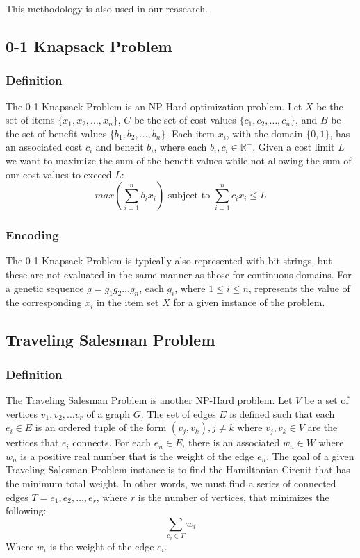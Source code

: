 \noindent This methodology is also used in our reasearch.

%
%
\subsection*{0-1 Knapsack Problem}
\subsubsection*{Definition}

The 0-1 Knapsack Problem is an NP-Hard optimization problem. Let $X$ be the set of items $\{x_1, x_2, \ldots, x_n\}$, $C$ be the set of cost values $\{c_1, c_2, \ldots, c_n\}$, and $B$ be the set of benefit values $\{b_1, b_2, \ldots, b_n\}$. Each item $x_i$, with the domain $\{0,1\}$, has an associated cost $c_i$ and benefit $b_i$, where each $b_i,c_i \in \mathbb{R}^{+}$. Given a cost limit $L$ we want to maximize the sum of the benefit values while not allowing the sum of our cost values to exceed $L$:
\[ max\left( \sum\limits_{i = 1}^{n} b_ix_i \right) \text{ subject to } \sum\limits_{i = 1}^{n} c_ix_i \leq L \]

\subsubsection*{Encoding}
The  0-1 Knapsack Problem is typically also represented with bit strings, but these are not evaluated in the same manner as those for continuous domains. For a genetic sequence $g = g_1 g_2 \ldots g_n$, each $g_i$, where $1 \leq i \leq n$, represents the value of the corresponding $x_i$ in the item set $X$ for a given instance of the problem. 

%
%
\subsection*{Traveling Salesman Problem}
\subsubsection*{Definition}
The Traveling Salesman Problem is another NP-Hard problem. Let $V$ be a set of vertices $v_1, v_2, \ldots v_r$ of a graph $G$. The set of edges $E$ is defined such that each $e_i \in E$ is an ordered tuple of the form $(v_j,v_k), j \not = k$ where $v_j,v_k \in V$ are the vertices that $e_i$ connects. For each $e_n \in E$, there is an associated $w_n \in W$ where $w_n$ is a positive real number that is the weight of the edge $e_n$. The goal of a given Traveling Salesman Problem instance is to find the Hamiltonian Circuit that has the minimum total weight. In other words, we must find a series of connected edges $T = e_{1},e_{2},\ldots,e_{r}$, where $r$ is the number of vertices, that minimizes the following\cite{Haxhimusa11}:
\[\sum\limits_{e_{i} \in T} w_{i}\]
\noindent Where $w_{i}$ is the weight of the edge $e_{i}$.

